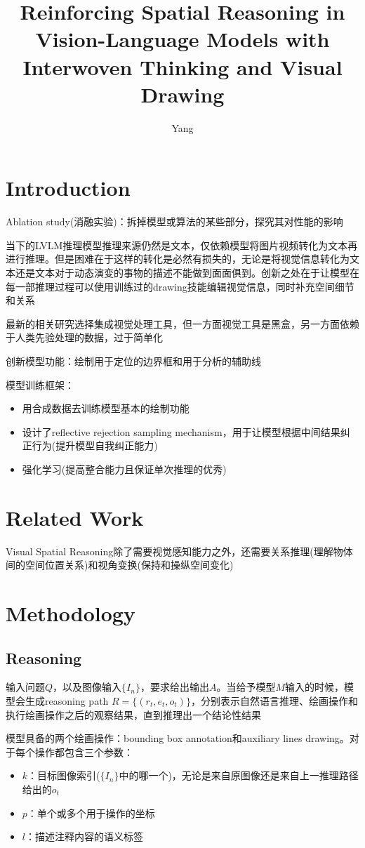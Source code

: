 \documentclass[a4paper,12pt]{article}
\title{Reinforcing Spatial Reasoning in Vision-Language Models with Interwoven Thinking and Visual Drawing}
\author{Yang}
\begin{document}
\maketitle

\section{Introduction}
Ablation study(消融实验)：拆掉模型或算法的某些部分，探究其对性能的影响

当下的LVLM推理模型推理来源仍然是文本，仅依赖模型将图片视频转化为文本再进行推理。但是困难在于这样的转化是必然有损失的，无论是将视觉信息转化为文本还是文本对于动态演变的事物的描述不能做到面面俱到。创新之处在于让模型在每一部推理过程可以使用训练过的drawing技能编辑视觉信息，同时补充空间细节和关系

最新的相关研究选择集成视觉处理工具，但一方面视觉工具是黑盒，另一方面依赖于人类先验处理的数据，过于简单化

创新模型功能：绘制用于定位的边界框和用于分析的辅助线

模型训练框架：
\begin{itemize}
    \item 用合成数据去训练模型基本的绘制功能
    \item 设计了reflective rejection sampling mechanism，用于让模型根据中间结果纠正行为(提升模型自我纠正能力)
    \item 强化学习(提高整合能力且保证单次推理的优秀)
\end{itemize}

\section{Related Work}
Visual Spatial Reasoning除了需要视觉感知能力之外，还需要关系推理(理解物体间的空间位置关系)和视角变换(保持和操纵空间变化)

\section{Methodology}
\subsection{Reasoning}
输入问题$Q$，以及图像输入$\{I_n\}$，要求给出输出$A$。当给予模型$M$输入的时候，模型会生成reasoning path $R = \{(r_t, e_t, o_t)\}$，分别表示自然语言推理、绘画操作和执行绘画操作之后的观察结果，直到推理出一个结论性结果

模型具备的两个绘画操作：bounding box annotation和auxiliary lines drawing。对于每个操作都包含三个参数：
\begin{itemize}
    \item $k$：目标图像索引($\{I_n\}$中的哪一个)，无论是来自原图像还是来自上一推理路径给出的$o_t$
    \item $p$：单个或多个用于操作的坐标
    \item $l$：描述注释内容的语义标签
\end{itemize}
\end{document}
